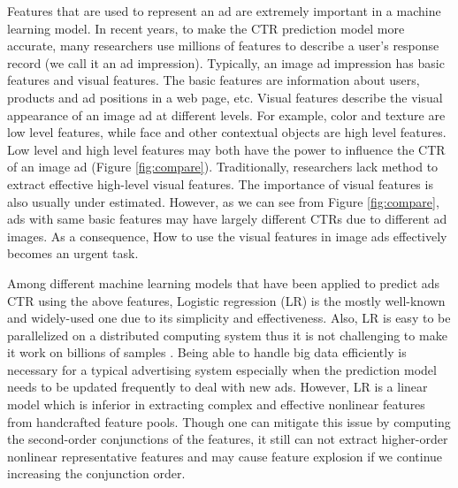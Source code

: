 \documentclass{sig-alternate}
\begin{document}
Features that are used to represent an ad are extremely important in a machine learning model. In recent years, to make the CTR prediction model more accurate, many researchers use millions of features to describe a user's response record (we call it an ad impression). Typically, an image ad impression has basic features and visual features. The basic features are information about users, products and ad positions in a web page, etc. Visual features describe the visual appearance of an image ad at different levels. For example, color and  texture are low level features, while face and other contextual objects are high level features. Low level and high level features may both have the power to influence the CTR of an image ad (Figure \ref{fig:compare}). Traditionally,  researchers lack  method to extract effective high-level visual features. The importance of visual features is also usually under estimated. However, as we can see from Figure \ref{fig:compare}, ads with same basic features may have largely different CTRs due to different ad images. As a consequence, How to use the visual features in image ads effectively becomes an urgent task.

Among different machine learning models that have been applied to predict ads CTR using the above features, Logistic regression (LR) is the mostly well-known and widely-used one due to its simplicity and effectiveness. Also, LR is easy to be parallelized on a distributed computing system thus it is not challenging to make it work on billions of samples \cite{chapelle2014simple}. Being able to handle big data efficiently is necessary for a typical advertising system especially when the prediction model needs to be updated frequently to deal with new ads. However, LR is a linear model which is inferior in extracting complex and effective nonlinear features from handcrafted feature pools. Though one can mitigate this issue by computing the second-order conjunctions of the features, it still can not extract higher-order nonlinear representative features and may cause feature explosion if we continue increasing the conjunction order. %
\end{document}
